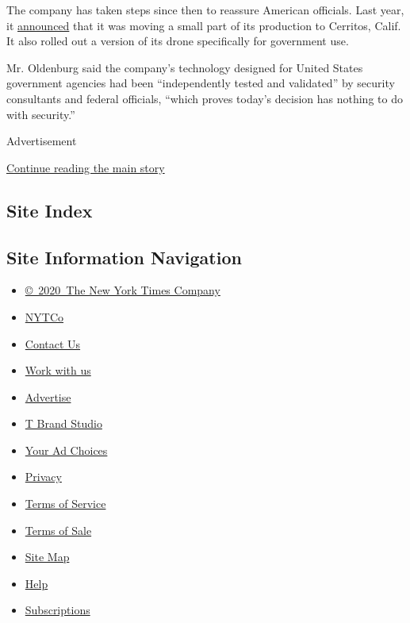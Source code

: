 The company has taken steps since then to reassure American officials.
Last year, it
\href{https://www.nytimes3xbfgragh.onion/2019/06/24/technology/dji-china-drones-security-us.html}{announced}
that it was moving a small part of its production to Cerritos, Calif. It
also rolled out a version of its drone specifically for government use.

Mr. Oldenburg said the company's technology designed for United States
government agencies had been ``independently tested and validated'' by
security consultants and federal officials, ``which proves today's
decision has nothing to do with security.''

Advertisement

\protect\hyperlink{after-bottom}{Continue reading the main story}

\hypertarget{site-index}{%
\subsection{Site Index}\label{site-index}}

\hypertarget{site-information-navigation}{%
\subsection{Site Information
Navigation}\label{site-information-navigation}}

\begin{itemize}
\tightlist
\item
  \href{https://help.nytimes3xbfgragh.onion/hc/en-us/articles/115014792127-Copyright-notice}{©~2020~The
  New York Times Company}
\end{itemize}

\begin{itemize}
\tightlist
\item
  \href{https://www.nytco.com/}{NYTCo}
\item
  \href{https://help.nytimes3xbfgragh.onion/hc/en-us/articles/115015385887-Contact-Us}{Contact
  Us}
\item
  \href{https://www.nytco.com/careers/}{Work with us}
\item
  \href{https://nytmediakit.com/}{Advertise}
\item
  \href{http://www.tbrandstudio.com/}{T Brand Studio}
\item
  \href{https://www.nytimes3xbfgragh.onion/privacy/cookie-policy\#how-do-i-manage-trackers}{Your
  Ad Choices}
\item
  \href{https://www.nytimes3xbfgragh.onion/privacy}{Privacy}
\item
  \href{https://help.nytimes3xbfgragh.onion/hc/en-us/articles/115014893428-Terms-of-service}{Terms
  of Service}
\item
  \href{https://help.nytimes3xbfgragh.onion/hc/en-us/articles/115014893968-Terms-of-sale}{Terms
  of Sale}
\item
  \href{https://spiderbites.nytimes3xbfgragh.onion}{Site Map}
\item
  \href{https://help.nytimes3xbfgragh.onion/hc/en-us}{Help}
\item
  \href{https://www.nytimes3xbfgragh.onion/subscription?campaignId=37WXW}{Subscriptions}
\end{itemize}
